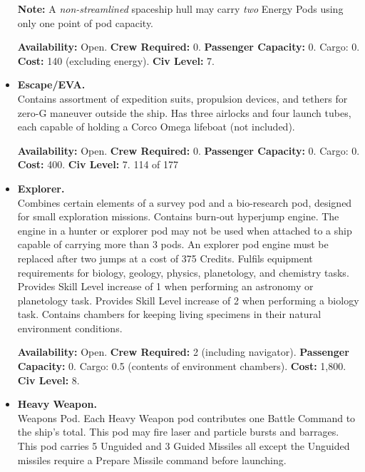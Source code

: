 \begin{itemize}
  \textbf{Note:} A \emph{non-streamlined} spaceship hull may carry
  \emph{two} Energy Pods using only one point of pod
  capacity.\label{sec:add-two-energy}
  
  \textbf{Availability:} Open. \textbf{Crew Required:} 0.
  \textbf{Passenger Capacity:} 0. Cargo: 0. \textbf{Cost:} 140
  (excluding energy). \textbf{Civ Level:} 7.
  
  

\item\textbf{Escape/EVA.}\\
  Contains assortment of expedition suits, propulsion devices, and
  tethers for zero-G maneuver outside the ship. Has three airlocks and
  four launch tubes, each capable of holding a Corco Omega lifeboat
  (not included).

  
  \textbf{Availability:} Open. \textbf{Crew Required:} 0.
  \textbf{Passenger Capacity:} 0. Cargo: 0. \textbf{Cost:} 400.
  \textbf{Civ Level:} 7.  114 of 177
  
  

\item\textbf{\hypertarget{tag:pod-explorer}{Explorer}.}\\
  Combines certain elements of a survey pod and a bio-research pod,
  designed for small exploration missions. Contains burn-out hyperjump
  engine. The engine in a hunter or explorer pod may not be used when
  attached to a ship capable of carrying more than 3 pods. An explorer
  pod engine must be replaced after two jumps at a cost of 375
  Credits. Fulfils equipment requirements for biology, geology,
  physics, planetology, and chemistry tasks. Provides Skill Level
  increase of 1 when performing an astronomy or planetology task.
  Provides Skill Level increase of 2 when performing a biology task.
  Contains chambers for keeping living specimens in their natural
  environment conditions.

  
  \textbf{Availability:} Open. \textbf{Crew Required:} 2 (including
  navigator).  \textbf{Passenger Capacity:} 0. Cargo: 0.5 (contents of
  environment chambers).  \textbf{Cost:} 1,800. \textbf{Civ Level:} 8.
  
  

\item\textbf{Heavy Weapon.}\\
  Weapons Pod. Each Heavy Weapon pod contributes one Battle Command to
  the ship's total. This pod may fire laser and particle bursts and
  barrages. This pod carries 5 Unguided and 3 Guided Missiles all
  except the Unguided missiles require a Prepare Missile command
  before launching.
  

\end{itemize}
